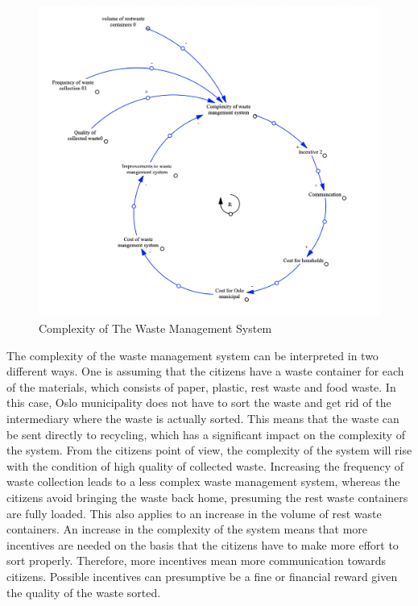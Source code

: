\begin{figure}[H]
\centering
\includegraphics [scale=0.30,angle=360]{figures/complexity.png}
\caption{Complexity of The Waste Management System}
\label{fig:complexity}
\end{figure}

\indent \newline
The complexity of  the waste management system can be interpreted in two different ways.
One is assuming that the citizens have a waste container for each of the materials, which consists of paper, plastic, rest waste and food waste. In this case, Oslo municipality does not have to sort the waste and get rid of the intermediary where the waste is actually sorted. This means that the waste can be sent directly to recycling, which has a significant impact on the complexity of the system. From the citizens point of view, the complexity of the system will rise with the condition of high quality of collected waste. Increasing the frequency of waste collection leads to a less complex waste management system, whereas the citizens avoid bringing the waste back home, presuming the rest waste containers are fully loaded. This also applies to an increase in the volume of rest waste containers. An increase in the complexity of the system means that more incentives are needed on the basis that the citizens have to make more effort to sort properly. Therefore, more incentives mean more communication towards citizens. Possible incentives can presumptive be a fine or financial reward given the quality of the waste sorted.  

